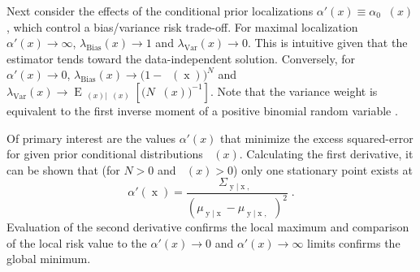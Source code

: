 \documentclass{article}
\DeclareMathOperator{\xrm}{\mathrm{x}}
\DeclareMathOperator{\yrm}{\mathrm{y}}
\DeclareMathOperator{\Erm}{\mathrm{E}}
\DeclareMathOperator{\thetam}{\theta_\text{m}}
\DeclareMathOperator{\upthetam}{\uptheta_\text{m}}
\DeclareMathOperator{\upthetac}{\uptheta_\text{c}}
\DeclareMathOperator{\uppsim}{\uppsi_\text{m}}
\DeclareMathOperator{\alpham}{\alpha_\text{m}}
\DeclareMathOperator{\alphac}{\alpha_\text{c}}
\begin{document}
Next consider the effects of the conditional prior localizations $\alpha'(x) \equiv \alpha_0 \alpham(x)$, which control a bias/variance risk trade-off. For maximal localization $\alpha'(x) \to \infty$, $\lambda_{\text{Bias}}(x) \to 1$ and $\lambda_{\text{Var}}(x) \to 0$. This is intuitive given that the estimator tends toward the data-independent solution. Conversely, for $\alpha'(x) \to 0$, $\lambda_{\text{Bias}}(x) \to \big( 1 - \upthetam(\xrm) \big)^N$ and $\lambda_{\text{Var}}(x) \to \Erm_{\uppsim(x) | \upthetam(x)}\left[ \big( N \uppsim(x) \big)^{-1} \right]$. Note that the variance weight is equivalent to the first inverse moment of a positive binomial random variable \cite{stephan}. 


Of primary interest are the values $\alpha'(x)$ that minimize the excess squared-error for given prior conditional distributions $\alphac(x)$. Calculating the first derivative, it can be shown that (for $N > 0$ and $\thetam(x) > 0$) only one stationary point exists at 
\begin{equation} \label{eq:alpha_x_min_Rex}
\alpha'(\xrm) = \frac{\Sigma_{\yrm | \xrm,\upthetac}}{\left( \mu_{\yrm | \xrm} - \mu_{\yrm | \xrm,\upthetac} \right)^2} \;.
\end{equation}
Evaluation of the second derivative confirms the local maximum and comparison of the local risk value to the $\alpha'(x) \to 0$ and $\alpha'(x) \to \infty$ limits confirms the global minimum.
\end{document}
